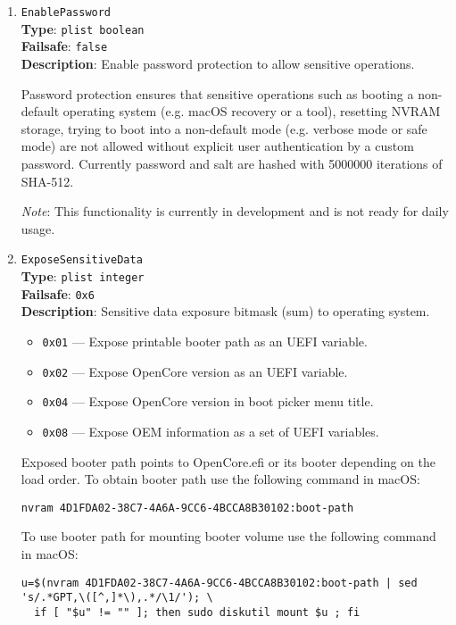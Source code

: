 \documentclass[]{article}
\providecommand{\tightlist}{%
  \setlength{\itemsep}{0pt}\setlength{\parskip}{0pt}}
\begin{document}
\begin{enumerate}
\item
  \texttt{EnablePassword}\\
  \textbf{Type}: \texttt{plist\ boolean}\\
  \textbf{Failsafe}: \texttt{false}\\
  \textbf{Description}: Enable password protection to allow sensitive operations.

  Password protection ensures that sensitive operations such as booting a non-default
  operating system (e.g. macOS recovery or a tool), resetting NVRAM storage,
  trying to boot into a non-default mode (e.g. verbose mode or safe mode) are not
  allowed without explicit user authentication by a custom password. Currently
  password and salt are hashed with 5000000 iterations of SHA-512.

  \emph{Note}: This functionality is currently in development and is not ready for
  daily usage.

\item
  \texttt{ExposeSensitiveData}\\
  \textbf{Type}: \texttt{plist\ integer}\\
  \textbf{Failsafe}: \texttt{0x6}\\
  \textbf{Description}: Sensitive data exposure bitmask (sum) to operating system.

  \begin{itemize}
  \tightlist
    \item \texttt{0x01} --- Expose printable booter path as an UEFI variable.
    \item \texttt{0x02} --- Expose OpenCore version as an UEFI variable.
    \item \texttt{0x04} --- Expose OpenCore version in boot picker menu title.
    \item \texttt{0x08} --- Expose OEM information as a set of UEFI variables.
  \end{itemize}

  Exposed booter path points to OpenCore.efi or its booter depending on the load order.
  To obtain booter path use the following command in macOS:
\begin{lstlisting}[label=nvrampath, style=ocbash]
nvram 4D1FDA02-38C7-4A6A-9CC6-4BCCA8B30102:boot-path
\end{lstlisting}

  To use booter path for mounting booter volume use the following command in macOS:
\begin{lstlisting}[label=nvrampathmount, style=ocbash]
u=$(nvram 4D1FDA02-38C7-4A6A-9CC6-4BCCA8B30102:boot-path | sed 's/.*GPT,\([^,]*\),.*/\1/'); \
  if [ "$u" != "" ]; then sudo diskutil mount $u ; fi
\end{lstlisting}


\end{enumerate}
\end{document}
